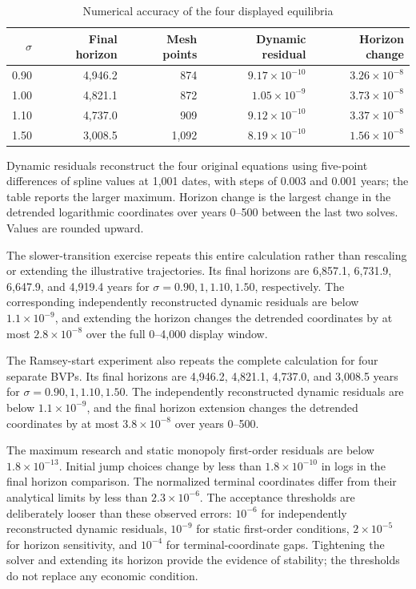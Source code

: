 \begin{table}[H]
 \centering
 \caption{Numerical accuracy of the four displayed equilibria}
 \label{tab:rewrite-numerical-audit}
 \small
 \begin{tabular}{rrrrr}
 \toprule
 $\sigma$ & Final horizon & Mesh points & Dynamic residual & Horizon change\\
 \midrule
 0.90 & 4,946.2 & 874  & $9.17\times10^{-10}$ & $3.26\times10^{-8}$\\
 1.00 & 4,821.1 & 872  & $1.05\times10^{-9}$ & $3.73\times10^{-8}$\\
 1.10 & 4,737.0 & 909  & $9.12\times10^{-10}$ & $3.37\times10^{-8}$\\
 1.50 & 3,008.5 & 1,092 & $8.19\times10^{-10}$ & $1.56\times10^{-8}$\\
 \bottomrule
 \end{tabular}
 \par\smallskip
 \begin{minipage}{0.95\textwidth}\footnotesize
 Dynamic residuals reconstruct the four original equations using five-point
 differences of spline values at 1,001 dates, with steps of 0.003 and 0.001
 years; the table reports the larger maximum. Horizon change is the largest
 change in the detrended logarithmic coordinates over years 0--500 between
 the last two solves. Values are rounded upward.
 \end{minipage}
\end{table}

The slower-transition exercise repeats this entire calculation rather than
rescaling or extending the illustrative trajectories. Its final horizons are 6,857.1,
6,731.9, 6,647.9, and 4,919.4 years for
$\sigma=0.90,1,1.10,1.50$, respectively. The corresponding independently
reconstructed dynamic residuals are below $1.1\times10^{-9}$, and extending
the horizon changes the detrended coordinates by at most
$2.8\times10^{-8}$ over the full 0--4,000 display window.

The Ramsey-start experiment also repeats the complete calculation for four
separate BVPs. Its final horizons are 4,946.2, 4,821.1, 4,737.0, and 3,008.5
years for $\sigma=0.90,1,1.10,1.50$. The independently reconstructed dynamic
residuals are below $1.1\times10^{-9}$, and the final horizon extension changes
the detrended coordinates by at most $3.8\times10^{-8}$ over years 0--500.

The maximum research and static monopoly first-order residuals are below
$1.8\times10^{-13}$. Initial jump choices change by less than
$1.8\times10^{-10}$ in logs in the final horizon comparison. The normalized
terminal coordinates differ from their analytical limits by less than
$2.3\times10^{-6}$. The acceptance thresholds are deliberately looser than
these observed errors: $10^{-6}$ for independently reconstructed dynamic
residuals, $10^{-9}$ for static first-order conditions, $2\times10^{-5}$ for
horizon sensitivity, and $10^{-4}$ for terminal-coordinate gaps. Tightening
the solver and extending its horizon provide the evidence of stability;
the thresholds do not replace any economic condition.

